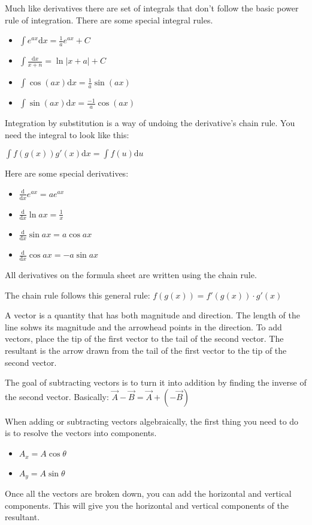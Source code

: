 \documentclass[../em.tex]{subfiles}
\begin{document}
Much like derivatives there are set of integrals that don't follow the basic power rule of integration. There are some special integral rules.
\begin{itemize}
    \item $\int{e^{ax}}\mathrm{d}x=\frac{1}{a}e^{ax}+C$
    \item $\int \frac{\mathrm{d}x}{x+n}=\ln |x+a|+C$
    \item $\int \cos(ax)\mathrm{d}x = \frac{1}{a}\sin(ax)$
    \item $\int \sin(ax)\mathrm{d}x=\frac{-1}{a}\cos(ax)$
\end{itemize}
Integration by substitution is a way of undoing the derivative's chain rule. You need the integral to look like this:

$\int f(g(x))g'(x)\mathrm{d}x=\int f(u)\mathrm{d}u$

Here are some special derivatives:
\begin{itemize}
    \item $\frac{\mathrm{d}}{\mathrm{d}x}e^{ax}=ae^{ax}$
    \item $\frac{\mathrm{d}}{\mathrm{d}x}\ln ax = \frac{1}{x}$
    \item $\frac{\mathrm{d}}{\mathrm{d}x}\sin ax = a\cos ax$
    \item $\frac{\mathrm{d}}{\mathrm{d}x}\cos ax = -a\sin ax$
\end{itemize}
All derivatives on the formula sheet are written using the chain rule.

The chain rule follows this general rule: $f(g(x))=f'(g(x))\cdot g'(x)$

A vector is a quantity that has both magnitude and direction. The length of the line sohws its magnitude and the arrowhead points in the direction.
To add vectors, place the tip of the first vector to the tail of the second vector.
The resultant is the arrow drawn from the tail of the first vector to the tip of the second vector.

The goal of subtracting vectors is to turn it into addition by finding the inverse of the second vector. Basically: $\vec{A}-\vec{B}=\vec{A}+(-\vec{B})$

When adding or subtracting vectors algebraically, the first thing you need to do is to resolve the vectors into components.
\begin{itemize}
    \item $A_x = A\cos \theta$
    \item $A_y = A\sin \theta$
\end{itemize}
Once all the vectors are broken down, you can add the horizontal and vertical components. This will give you the horizontal and vertical components of the resultant.
\end{document}
